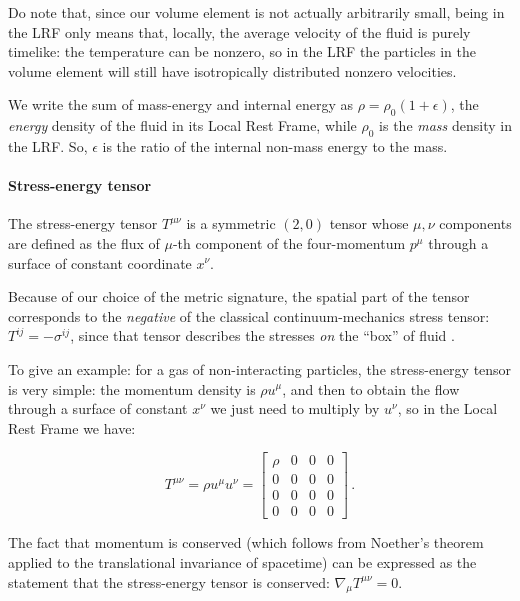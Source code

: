 \documentclass[main.tex]{subfiles}
\begin{document}
Do note that, since our volume element is not actually arbitrarily small, being in the LRF only means that, locally, the average velocity of the fluid is purely timelike: the temperature can be nonzero, so in the LRF the particles in the volume element will still have isotropically distributed nonzero velocities.

We write the sum of mass-energy and internal energy as $\rho = \rho_0 (1+\epsilon)$, the \emph{energy} density of the fluid in its Local Rest Frame, while \(\rho_0\) is the \emph{mass} density in the LRF.
So, $\epsilon$ is the ratio of the internal non-mass energy to the mass.

\paragraph{Stress-energy tensor} \label{par:stress-energy-tensor}

The stress-energy tensor \(T^{\mu\nu}\) is a symmetric \((2,0)\) tensor whose \(\mu, \nu\) components are defined as the flux of \(\mu\)-th component of the four-momentum \(p^\mu\) through a surface of constant coordinate \(x^\nu\).

Because of our choice of the metric signature, the spatial part of the tensor corresponds to the \emph{negative} of the classical continuum-mechanics stress tensor: \(T^{ij} = - \sigma^{ij}\), since that tensor describes the stresses \emph{on} the ``box'' of fluid \cite[]{Moretti:2016}.

To give an example: for a gas of non-interacting particles, the stress-energy tensor is very simple: the momentum density is \(\rho u^\mu\), and then to obtain the flow through a surface of constant \(x^\nu\) we just need to multiply by \(u^\nu\), so in the Local Rest Frame we have:

\begin{equation}
    T^{\mu\nu} = \rho u^\mu u^\nu = \begin{bmatrix}
    \rho    & 0  &  0 & 0 \\
      0 & 0  & 0  & 0 \\
      0 & 0  & 0  & 0 \\
      0 & 0  & 0  & 0
    \end{bmatrix}\,.
\end{equation}

The fact that momentum is conserved (which follows from Noether's theorem applied to the translational invariance of spacetime) can be expressed as the statement that the stress-energy tensor is conserved: \(\nabla_\mu T^{\mu\nu} = 0\).
\end{document}
